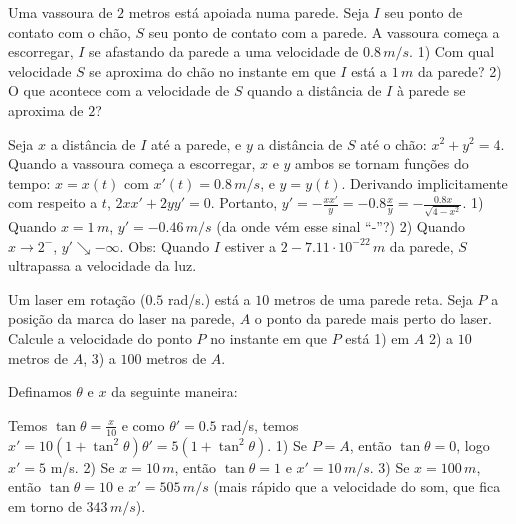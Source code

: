 \begin{exo}
Uma vassoura de $2$ metros está apoiada numa parede. Seja $I$
seu ponto de contato com o chão, $S$ seu ponto de contato com
a parede. A vassoura começa a
escorregar, $I$ se afastando da parede a
uma velocidade de $0.8\, m/s$. 1) Com qual velocidade $S$ se
aproxima do chão no instante em que $I$ está a $1\,m$ da
parede? 2) O que acontece com a
velocidade de $S$ quando a distância de $I$ à parede se aproxima de $2$?
\begin{sol}
Seja $x$ a distância de $I$ até a parede, e $y$ a distância de $S$ até o chão:
$x^2+y^2=4$. Quando a vassoura começa a escorregar, $x$ e $y$ ambos se
tornam funções do tempo: $x=x(t)$ com $x'(t)=0.8\,m/s$, e $y=y(t)$. Derivando
implicitamente com respeito a $t$,
$2xx'+2yy'=0$. Portanto, 
$y'=-\frac{xx'}{y}=-0.8\frac{x}{y}=-\frac{0.8x}{\sqrt{4-x^2}}$.
1) Quando $x=1\,m$, $y'=-0.46\,m/s$ (da onde vém esse sinal ``-''?)
2) Quando $x\to 2^-$, $y'\searrow -\infty$.
Obs: Quando $I$ estiver a $2-7.11\cdot 10^{-22}\,m$ da parede,
$S$ ultrapassa a velocidade da luz.
\end{sol}
\end{exo}

\begin{exo}
Um laser em rotação ($0.5$ rad/s.) está a $10$ metros de uma parede
reta. Seja $P$ a posição da marca do laser na parede, $A$ o ponto da parede
mais perto do laser.
Calcule a velocidade do ponto $P$ no instante em que $P$ está 1) em $A$ 2) a
$10$ metros de $A$, 3) a $100$ metros de $A$.
\begin{sol}
Definamos $\theta$ e $x$ da seguinte maneira:
\begin{center}
\begin{bmlimage}\end{bmlimage}
\end{center}
Temos $\tan \theta=\frac{x}{10}$ e como $\theta'=0.5$ rad/s, temos
$x'=10(1+\tan^2\theta)\theta'=5(1+\tan^2\theta)$.
1) Se $P=A$, então $\tan \theta=0$, logo $x'=5$ m/s. 2) Se $x=10\,m$, então
$\tan \theta=1$ e $x'=10\,m/s$.
3) Se  $x=100\,m$, então $\tan \theta=10$ e $x'=505\,m/s$ (mais rápido que a
velocidade do som, que fica em torno de $343\, m/s$).
\end{sol}
\end{exo}



